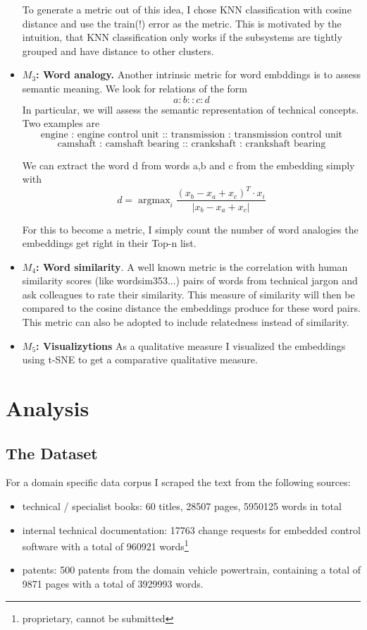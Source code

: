 \documentclass[10pt,a4paper]{article}
\DeclareMathOperator*{\argmax}{argmax} %
\begin{document}
\begin{itemize}
		To generate a metric out of this idea, I chose KNN classification with cosine distance and use the train(!) error as the metric. This is motivated by the intuition, that KNN classification only works if the subsystems are tightly grouped and have distance to other clusters. 

		
		\item \textbf{$M_3$: Word analogy.} Another intrinsic metric for word embddings is to assess semantic meaning. We look for relations of the form
		$$ a:b::c:d $$
		In particular, we will assess the semantic representation of technical concepts. Two examples are 
		$$\text{engine : engine control unit :: transmission : transmission control unit}$$
		$$\text{camshaft : camshaft bearing :: crankshaft : crankshaft bearing}$$
		
		We can extract the word d from words a,b and c from the embedding simply with
		\begin{equation}
		d=\argmax_{i} \frac{(x_b -x_a + x_c)^T\cdot x_i}{|x_b-x_a+x_c|}
		\end{equation}
		
		For this to become a metric, I simply count the number of word analogies the embeddings get right in their Top-n list. 
		
		\item \textbf{$M_4$: Word similarity}. A well known metric is the correlation with human similarity scores (like wordsim353...) pairs of words from technical jargon and ask colleagues to rate their similarity. This measure of similarity will then be compared to the cosine distance the embeddings produce for these word pairs. This metric can also be adopted to include relatedness instead of similarity.
		
		\item \textbf{$M_5$: Visualizytions} As a qualitative measure I visualized the embeddings using t-SNE \cite{vanDerMaaten2008} to get a comparative qualitative measure.
		
	\end{itemize}
	
	\section{Analysis}
	\subsection{The Dataset}
	
	For a domain specific data corpus I scraped the text from the following sources:
	\begin{itemize}
		\item technical / specialist books: 60 titles, 28507 pages, 5950125 words in total 
		\item internal technical documentation: 17763 change requests for embedded control software with a total of 960921 words\footnote{proprietary, cannot be submitted} 
		\item patents: 500 patents from the domain vehicle powertrain, containing a total of 9871 pages with a total of 3929993 words.
	\end{itemize}
	
\end{document}
